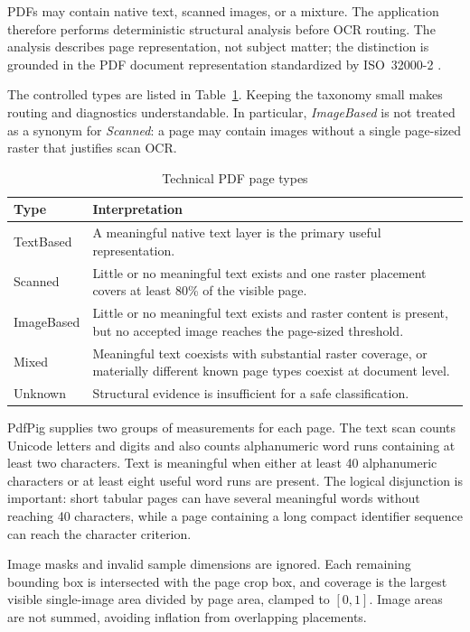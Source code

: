 PDFs may contain native text, scanned images, or a mixture. The application
therefore performs deterministic structural analysis before OCR routing. The
analysis describes page representation, not subject matter; the distinction is
grounded in the PDF document representation standardized by ISO~32000-2
\cite{ISO32000PDF}.

The controlled types are listed in Table~\ref{tab:technical-types}. Keeping the
taxonomy small makes routing and diagnostics understandable. In particular,
\emph{ImageBased} is not treated as a synonym for \emph{Scanned}: a page may
contain images without a single page-sized raster that justifies scan OCR.

\begin{table}[!htbp]
	\centering
	\small
	\caption{Technical PDF page types}
	\label{tab:technical-types}
	\begin{tabular}{p{2.6cm}p{10.4cm}}
		\toprule
		Type & Interpretation \\
		\midrule
		TextBased & A meaningful native text layer is the primary useful representation. \\
		Scanned & Little or no meaningful text exists and one raster placement covers at least 80\% of the visible page. \\
		ImageBased & Little or no meaningful text exists and raster content is present, but no accepted image reaches the page-sized threshold. \\
		Mixed & Meaningful text coexists with substantial raster coverage, or materially different known page types coexist at document level. \\
		Unknown & Structural evidence is insufficient for a safe classification. \\
		\bottomrule
	\end{tabular}
\end{table}

PdfPig supplies two groups of measurements for each page. The text scan counts
Unicode letters and digits and also counts alphanumeric word runs containing at
least two characters. Text is meaningful when either at least 40 alphanumeric
characters or at least eight useful word runs are present. The logical
disjunction is important: short tabular pages can have several meaningful
words without reaching 40 characters, while a page containing a long compact
identifier sequence can reach the character criterion.

Image masks and invalid sample dimensions are ignored. Each remaining bounding
box is intersected with the page crop box, and coverage is the largest visible
single-image area divided by page area, clamped to $[0,1]$. Image areas are not
summed, avoiding inflation from overlapping placements.

